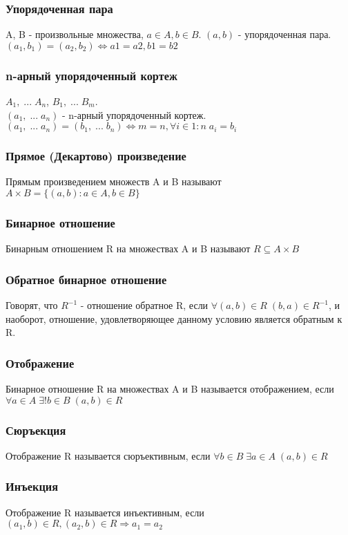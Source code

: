\subsubsection{Упорядоченная пара}
A, B - произвольные множества, $a \in A, b \in B$. $(a, b)$ - упорядоченная пара. $(a_1, b_1) = (a_2, b_2) \Leftrightarrow a1 = a2, b1 = b2$
\subsubsection{n-арный упорядоченный кортеж}
$A_1, \; ... \; A_n$, $B_1, \; ... \; B_m$.\\
$(a_1, \; ... \; a_n)$ - n-арный упорядоченный кортеж.\\
$(a_1, \; ... \; a_n) = (b_1, \; ... \; b_n) \Leftrightarrow m = n, \forall i \in 1:n \; a_i = b_i$ 
\subsubsection{Прямое (Декартово) произведение}
Прямым произведением множеств A и B называют $A \times B = \{(a, b) : a \in A, b \in B\}$
\subsubsection{Бинарное отношение}
Бинарным отношением R на множествах A и B называют $R \subseteq A \times B$
\subsubsection{Обратное бинарное отношение}
Говорят, что $R^{-1}$ - отношение обратное R, если $\forall (a, b) \in R \; (b, a) \in R^{-1}$, и наоборот, отношение, удовлетворяющее данному условию является обратным к R.
\subsubsection{Отображение}
Бинарное отношение R на множествах A и B называется отображением, если $\forall a \in A \; \exists ! b \in B \;(a, b) \in R$
\subsubsection{Сюръекция}
Отображение R называется сюръективным, если $\forall b \in B \; \exists a \in A \;(a, b) \in R$
\subsubsection{Инъекция}
Отображение R называется инъективным, если $(a_1, b) \in R, (a_2, b) \in R \Rightarrow a_1 = a_2$

